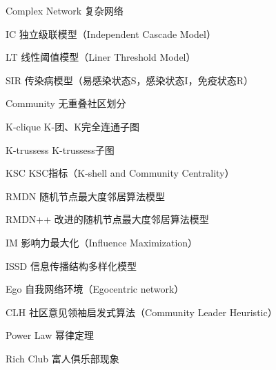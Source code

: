 \begin{denotation}

\item[Complex Network] 复杂网络
\item[IC] 独立级联模型（Independent Cascade Model）
\item[LT] 线性阈值模型（Liner Threshold Model）
\item[SIR] 传染病模型（易感染状态S，感染状态I，免疫状态R）
\item[Community] 无重叠社区划分
\item[K-clique]	K-团、K完全连通子图
\item[K-trussess]	K-trussess子图
\item[KSC]	KSC指标（K-shell and Community Centrality）
\item[RMDN]	随机节点最大度邻居算法模型
\item[RMDN++]	改进的随机节点最大度邻居算法模型
\item[IM]	影响力最大化（Influence Maximization）
\item[ISSD]	信息传播结构多样化模型
\item[Ego]  自我网络环境（Egocentric network）
\item [CLH] 社区意见领袖启发式算法（Community Leader Heuristic）
\item [Power Law] 幂律定理
\item [Rich Club] 富人俱乐部现象


\end{denotation}
